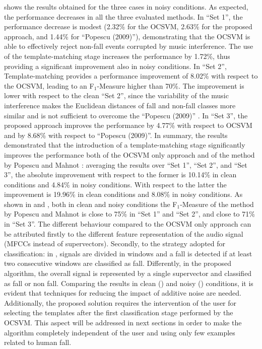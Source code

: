  shows the results obtained for the three cases in noisy conditions. As expected, the performance decreases in all the three evaluated methods. In ``Set 1'', the performance decrease is modest (2.32\% for the OCSVM, 2.63\% for the proposed approach, and 1.44\% for ``Popescu (2009)''), demonstrating that the OCSVM is able to effectively reject non-fall events corrupted by music interference. The use of the template-matching stage increases the performance by 1.72\%, thus providing a significant improvement also in noisy conditions. In ``Set 2'', Template-matching provides a performance improvement of 8.02\% with respect to the OCSVM, leading to an F$_1$-Measure higher than 70\%. The improvement is lower with respect to the clean ``Set 2'', since the variability of the music interference makes the Euclidean distances of fall and non-fall classes more similar and is not sufficient to overcome the ``Popescu (2009)'' \cite{Popescu2009}. In ``Set 3'', the proposed approach improves the performance by 4.77\% with respect to OCSVM and by 8.68\% with respect to ``Popescu (2009)''.
In summary, the results demonstrated that the introduction of a template-matching stage significantly improves the performance both of the OCSVM only approach and of the method by Popescu and Mahnot \cite{Popescu2009}: averaging the results over ``Set 1'', ``Set 2'', and ``Set 3'', the absolute improvement with respect to the former is 10.14\% in clean conditions and 4.84\% in noisy conditions. With respect to the latter \cite{Popescu2009} the improvement is 19.96\% in clean conditions and 8.08\% in noisy conditions. As shown in  and , both in clean and noisy conditions the F$_1$-Measure of the method by Popescu and Mahnot \cite{Popescu2009} is close to 75\% in ``Set 1'' and ``Set 2'', and close to 71\% in ``Set 3''. The different behaviour compared to the OCSVM only approach can be attributed firstly to the different feature representation of the audio signal (MFCCs instead of supervectors). Secondly, to the strategy adopted for classification: in \cite{Popescu2009}, signals are divided in windows and a fall is detected if at least two consecutive windows are classified as fall. Differently, in the proposed algorithm, the overall signal is represented by a single supervector and classified as fall or non fall.
Comparing the results in clean () and noisy () conditions, it is evident that techniques for reducing the impact of additive noise are needed. Additionally, the proposed solution requires the intervention of the user for selecting the templates after the first classification stage performed by the OCSVM. This aspect will be addressed in next sections in order to make the algorithm completely independent of the user and using only few examples related to human fall.

